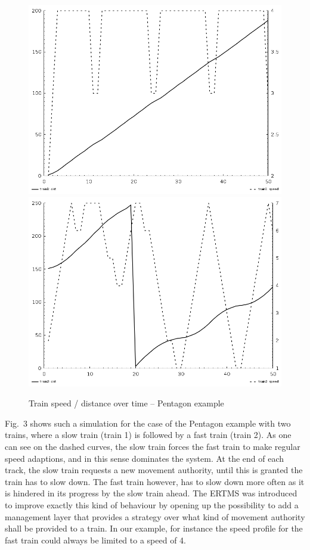 \documentclass[runningheads,a4paper]{llncs}
\begin{document}
\begin{figure}[H]
\begin{center}
\includegraphics[scale=0.34]{t1graph} 
\includegraphics[scale=0.34]{t2graph} 
\end{center}
\caption{Train speed / distance over time -- Pentagon example}
\end{figure}

Fig.~3 shows such a simulation for the case of the Pentagon example
with two trains, where a slow train (train 1) is followed by a fast
train (train 2). As one can see on the dashed curves, the slow train
forces the fast train to make regular speed adaptions, and in this
sense dominates the system. At the end of each track, the slow train
requests a new movement authority, until this is granted the train has
to slow down. The fast train however, has to slow down more often as
it is hindered in its progress by the slow train ahead. The ERTMS was
introduced to improve exactly this kind of behaviour by opening up the
possibility to add a management layer that provides a strategy over what
kind of movement authority shall be provided to a train. In our
example, for instance the speed profile for the fast train could
always be limited to a speed of 4.
\end{document}

